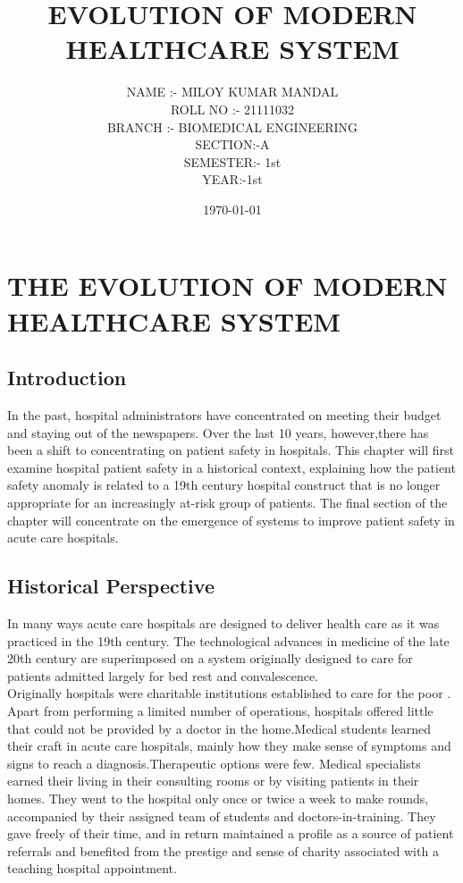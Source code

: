 \documentclass[a4paper,12pt]{report}
\title{EVOLUTION OF MODERN HEALTHCARE SYSTEM}
\author{NAME :- MILOY KUMAR MANDAL\\ROLL NO :- 21111032\\BRANCH :- BIOMEDICAL ENGINEERING\\SECTION:-A\\SEMESTER:- 1st\\YEAR:-1st}
\date{\today}
\begin{document}
\maketitle
{}
\tableofcontents
\newpage
{}

\chapter{THE EVOLUTION OF MODERN HEALTHCARE SYSTEM}

\section{Introduction}
In the past, hospital administrators have concentrated on meeting their budget and staying out of the newspapers. Over the last 10 years, however,there has been a shift to concentrating on patient safety in hospitals. This chapter will first examine hospital patient safety in a historical context, explaining how the patient safety anomaly is related to a 19th century hospital construct that is no longer appropriate for an increasingly at-risk group of patients. The final section of the chapter will concentrate on the emergence of systems to improve patient safety in acute care hospitals.

\section{Historical Perspective}
In many ways acute care hospitals are designed to deliver health care as it was practiced in the 19th century. The technological advances in medicine of the late 20th century are superimposed on a system originally designed to care for patients admitted largely for bed rest and convalescence.\\

Originally hospitals were charitable institutions established to care for the poor . Apart from performing a limited number of operations, hospitals offered little that could not be provided by a doctor in the home.Medical students learned their craft in acute care hospitals, mainly how they make sense of symptoms and signs to reach a diagnosis.Therapeutic options were few. Medical specialists earned their living in their consulting rooms or by visiting patients in their homes. They went to the hospital only once or twice a week to make rounds, accompanied by their assigned team of
students and doctors-in-training. They gave freely of their time, and in return maintained a profile as a source of patient referrals and benefited from the prestige and sense of charity associated with a teaching hospital appointment.\\
\end{document}
